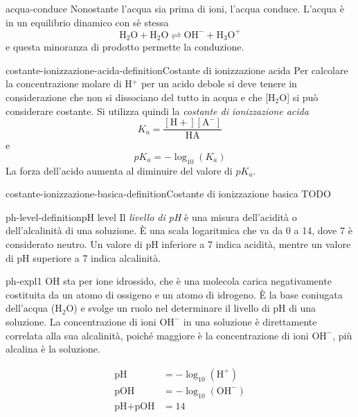 \documentclass[preview]{standalone}
\begin{document}

\begin{snippet}{acqua-conduce}
    Nonostante l'acqua sia prima di ioni, l'acqua conduce.
    L'acqua è in un equilibrio dinamico con sè stessa
    \[
        \text{H}_2\text{O} + \text{H}_2\text{O} \rightleftharpoons \text{OH}^- + \text{H}_3\text{O}^+
    \]
    e questa minoranza di prodotto permette la conduzione.
\end{snippet}

\begin{snippetdefinition}{costante-ionizzazione-acida-definition}{Costante di ionizzazione acida}
    Per calcolare la concentrazione molare di H\({}^+\) per un acido
    debole si deve tenere in considerazione che non si
    dissociano del tutto in acqua e che [H\({}_2\)O] si può
    considerare costante.
    Si utilizza quindi la \textit{costante di ionizzazione acida}
    \[
        K_a = \frac{[\text{H}+][\text{A}^-]}{\text{HA}}
    \]
    e
    \[
        pK_a=-\log_{10}(K_a)
    \]
    La forza dell'acido aumenta al diminuire del valore di
    \(pK_a\).
\end{snippetdefinition}

\begin{snippetdefinition}{costante-ionizzazione-basica-definition}{Costante di ionizzazione basica}
    TODO
\end{snippetdefinition}

\begin{snippetdefinition}{ph-level-definition}{pH level}
    Il \textit{livello di pH} è una misura dell'acidità o dell'alcalinità di una soluzione.
    È una scala logaritmica che va da 0 a 14, dove 7 è considerato neutro.
    Un valore di pH inferiore a 7 indica acidità, mentre un valore di pH superiore a 7 indica alcalinità.
\end{snippetdefinition}

\begin{snippet}{ph-expl1}
    OH sta per ione idrossido, che è una molecola carica negativamente costituita da un atomo di ossigeno e un atomo di idrogeno.
    È la base coniugata dell'acqua (\(\text{H}_2\text{O}\)) e svolge un ruolo nel determinare il livello di pH di una soluzione.
    La concentrazione di ioni \(\text{OH}^-\) in una soluzione è direttamente correlata alla sua alcalinità,
    poiché maggiore è la concentrazione di ioni \(\text{OH}^-\), più alcalina è la soluzione.

    \begin{align*}
        \text{pH} &= - \log_{10}(\text{H}^+) \\
        \text{pOH} &= - \log_{10}(\text{OH}^-) \\
        \text{pH} + \text{pOH} &= 14 \\
    \end{align*}
\end{snippet}
\end{document}
